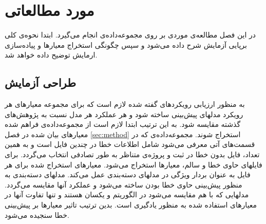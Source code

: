 \chapter{مورد مطالعاتی}
در این فصل مطالعه‌ی موردی بر روی مجموعه‌داده‌ی  \cite{Just:2014:DDE:2610384.2628055} انجام می‌گیرد. ابتدا نحوه‌ی کلی برپایی آزمایش شرح داده می‌شود و سپس چگونگی استخراج معیارها و پیاده‌سازی ارمایش توضیح داده خواهد شد. 
\section{طراحی آزمایش}
به منظور ارزیابی رویکردهای گفته شده لازم است که برای مجموعه معیارهای هر رویکرد مدلهای پیش‌بینی ساخته شود و هر عملکرد هر مدل نسبت به پژوهش‌های گذشته مقایسه شود. به این ترتیب ابتدا لازم است از مجموعه‌داده‌ی فراهم شده معیارهای بیان شده در فصل \ref{sec:method} استخراج شوند. مجموعه‌داده‌ی  که در قسمت‌های آتی معرفی می‌شود شامل اطلاعات خطا در چندین فایل است و به همین تعداد، فایل بدون خطا در ثبت و پروژه‌ی متناظر به طور تصادفی انتخاب می‌گردد. برای فایلهای حاوی خطا و سالم، معیارها استخراج می‌شود. معیارهای استخراج شده  برای هر فایل به عنوان بردار ویژگی در مدلهای دسته‌بندی عمل می‌کند. مدلهای دسته‌بندی به منظور پیش‌بینی حاوی خطا بودن ساخته می‌شود و عملکرد آنها مقایسه می‌گردد. مدلهایی که با هم مقایسه می‌شود در الگوریتم و  یکسان هستند و تنها تفاوت آنها در معیارهای استفاده شده به منظور یادگیری است. بدین ترتیب تاثیر معیارها بر پیش‌بینی خطا سنجیده می‌شود. 




